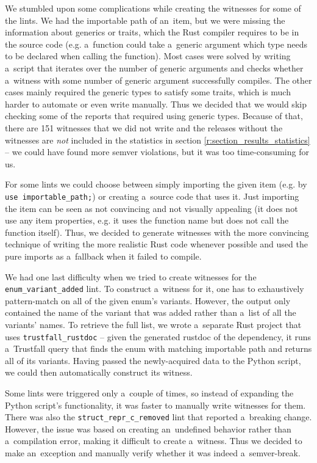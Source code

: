 \documentclass[licencjacka,en]{pracamgr}
\begin{document}
We stumbled upon some complications while creating the witnesses for some of the lints.
We had the importable path of an~item, but we were missing the information
about generics or traits, which the Rust compiler requires to be in the source code
(e.g. a~function could take a~generic argument which type needs to be declared when calling
the function). Most cases were solved by writing a~script that iterates over the number of
generic arguments and checks whether a~witness with some number of generic argument
successfully compiles. The other cases mainly required the generic types to satisfy some traits,
which is much harder to automate or even write manually.
Thus we decided that we would skip checking some of the reports that required using generic types.
Because of that, there are 151 witnesses that we did not write
and the releases without the witnesses are \textit{not} included in the statistics in section
\ref{r:section_results_statistics} -- we could have found more semver violations, but it was
too time-consuming for us.

For some lints we could choose between simply importing the given item
(e.g. by \texttt{use importable\_path;}) or creating a~source code that uses it.
Just importing the item can be seen as not convincing and not visually appealing (it does not use
any item properties, e.g. it uses the function name but does not call the function itself).
Thus, we decided to generate witnesses with the more convincing technique of writing
the more realistic Rust code whenever possible and used the pure imports as a~fallback when
it failed to compile.

We had one last difficulty when we tried to create witnesses for
the \texttt{enum\_variant\_added} lint. To construct a~witness for it, one has to exhaustively
pattern-match on all of the given enum's variants. However, the output only contained the name
of the variant that was added rather than a~list of all the variants' names.
To retrieve the full list, we wrote a~separate
Rust project that uses \texttt{trustfall\_rustdoc} -- given the generated rustdoc
of the dependency, it runs a~Trustfall query that finds the enum with matching importable path
and returns all of its variants. Having passed the newly-acquired data to the Python script,
we could then automatically construct its witness.

Some lints were triggered only a~couple of times, so instead of expanding the Python script's
functionality, it was faster to manually write witnesses for them.
There was also the \texttt{struct\_repr\_c\_removed} lint that reported a~breaking change.
However, the issue was based on creating an~undefined behavior rather than a~compilation error,
making it difficult to create a~witness.
Thus we decided to make an~exception and manually verify whether it was indeed a~semver-break.
\end{document}
